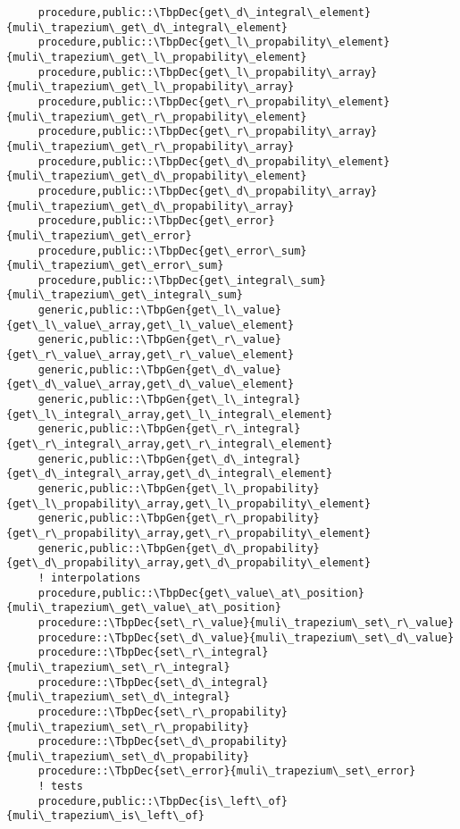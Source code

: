 \begin{Verbatim}
     procedure,public::\TbpDec{get\_d\_integral\_element}{muli\_trapezium\_get\_d\_integral\_element}
     procedure,public::\TbpDec{get\_l\_propability\_element}{muli\_trapezium\_get\_l\_propability\_element}
     procedure,public::\TbpDec{get\_l\_propability\_array}{muli\_trapezium\_get\_l\_propability\_array}
     procedure,public::\TbpDec{get\_r\_propability\_element}{muli\_trapezium\_get\_r\_propability\_element}
     procedure,public::\TbpDec{get\_r\_propability\_array}{muli\_trapezium\_get\_r\_propability\_array}
     procedure,public::\TbpDec{get\_d\_propability\_element}{muli\_trapezium\_get\_d\_propability\_element}
     procedure,public::\TbpDec{get\_d\_propability\_array}{muli\_trapezium\_get\_d\_propability\_array}
     procedure,public::\TbpDec{get\_error}{muli\_trapezium\_get\_error}
     procedure,public::\TbpDec{get\_error\_sum}{muli\_trapezium\_get\_error\_sum}
     procedure,public::\TbpDec{get\_integral\_sum}{muli\_trapezium\_get\_integral\_sum}
     generic,public::\TbpGen{get\_l\_value}{get\_l\_value\_array,get\_l\_value\_element}
     generic,public::\TbpGen{get\_r\_value}{get\_r\_value\_array,get\_r\_value\_element}
     generic,public::\TbpGen{get\_d\_value}{get\_d\_value\_array,get\_d\_value\_element}
     generic,public::\TbpGen{get\_l\_integral}{get\_l\_integral\_array,get\_l\_integral\_element}
     generic,public::\TbpGen{get\_r\_integral}{get\_r\_integral\_array,get\_r\_integral\_element}
     generic,public::\TbpGen{get\_d\_integral}{get\_d\_integral\_array,get\_d\_integral\_element}
     generic,public::\TbpGen{get\_l\_propability}{get\_l\_propability\_array,get\_l\_propability\_element}
     generic,public::\TbpGen{get\_r\_propability}{get\_r\_propability\_array,get\_r\_propability\_element}
     generic,public::\TbpGen{get\_d\_propability}{get\_d\_propability\_array,get\_d\_propability\_element}
     ! interpolations
     procedure,public::\TbpDec{get\_value\_at\_position}{muli\_trapezium\_get\_value\_at\_position}
     procedure::\TbpDec{set\_r\_value}{muli\_trapezium\_set\_r\_value}
     procedure::\TbpDec{set\_d\_value}{muli\_trapezium\_set\_d\_value}
     procedure::\TbpDec{set\_r\_integral}{muli\_trapezium\_set\_r\_integral}
     procedure::\TbpDec{set\_d\_integral}{muli\_trapezium\_set\_d\_integral}
     procedure::\TbpDec{set\_r\_propability}{muli\_trapezium\_set\_r\_propability}
     procedure::\TbpDec{set\_d\_propability}{muli\_trapezium\_set\_d\_propability}
     procedure::\TbpDec{set\_error}{muli\_trapezium\_set\_error}
     ! tests
     procedure,public::\TbpDec{is\_left\_of}{muli\_trapezium\_is\_left\_of}

\end{Verbatim}
